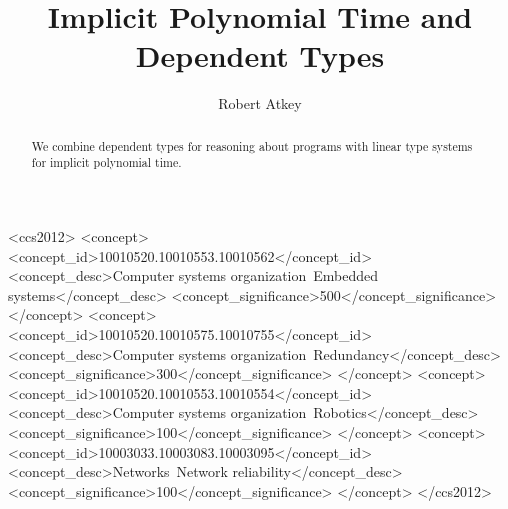 \documentclass[acmsmall,review]{acmart}
\begin{document}
\title{Implicit Polynomial Time and Dependent Types}

\author{Robert Atkey}



\begin{abstract}
  We combine dependent types for reasoning about programs with linear
  type systems for implicit polynomial time.
\end{abstract}

\begin{CCSXML}
<ccs2012>
 <concept>
  <concept_id>10010520.10010553.10010562</concept_id>
  <concept_desc>Computer systems organization~Embedded systems</concept_desc>
  <concept_significance>500</concept_significance>
 </concept>
 <concept>
  <concept_id>10010520.10010575.10010755</concept_id>
  <concept_desc>Computer systems organization~Redundancy</concept_desc>
  <concept_significance>300</concept_significance>
 </concept>
 <concept>
  <concept_id>10010520.10010553.10010554</concept_id>
  <concept_desc>Computer systems organization~Robotics</concept_desc>
  <concept_significance>100</concept_significance>
 </concept>
 <concept>
  <concept_id>10003033.10003083.10003095</concept_id>
  <concept_desc>Networks~Network reliability</concept_desc>
  <concept_significance>100</concept_significance>
 </concept>
</ccs2012>
\end{CCSXML}
\end{document}

